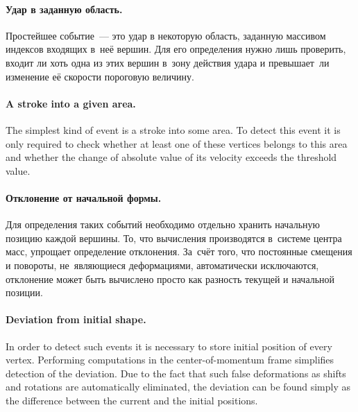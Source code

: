 \documentclass[a4paper, 12pt, titlepage]{extarticle}
\begin{document}
\begin{original}
        \paragraph{Удар в заданную область.}
        Простейшее событие~--- это удар в некоторую область, заданную массивом индексов
        входящих в~неё вершин. Для его определения нужно лишь проверить, входит ли хоть одна из этих
        вершин в~зону действия удара и превышает~ли изменение её скорости пороговую величину.
\end{original}

        \paragraph{A stroke into a given area.}
        The simplest kind of event is a stroke into some area. To detect this event it is only
        required to check whether at least one of these vertices belongs to this area and whether
        the change of absolute value of its velocity exceeds the threshold value.

\begin{original}
        \paragraph{Отклонение от начальной формы.}
        Для определения таких событий необходимо отдельно хранить начальную позицию каждой вершины.
        То, что вычисления производятся в~системе центра масс, упрощает определение
        отклонения. За~счёт того, что постоянные смещения и повороты, не~являющиеся деформациями,
        автоматически исключаются, отклонение может быть вычислено просто как разность текущей и
        начальной позиции.
\end{original}

        \paragraph{Deviation from initial shape.}
        In order to detect such events it is necessary to store initial position of every vertex.
        Performing computations in the center-of-momentum frame simplifies detection of the deviation.
        Due to the fact that such false deformations as shifts and rotations are automatically
        eliminated, the deviation can be found simply as the difference between the current and the
        initial positions.
\end{document}
